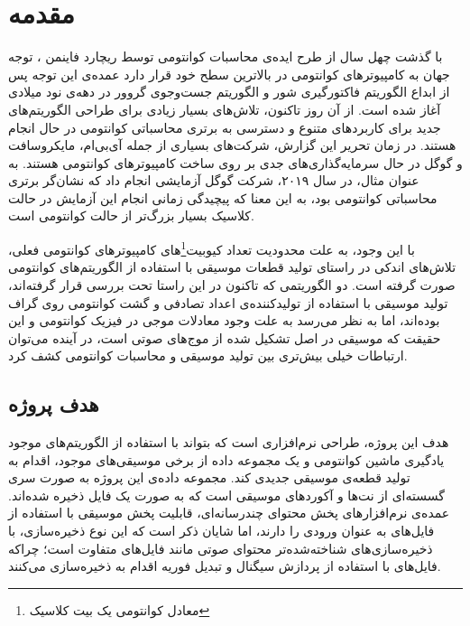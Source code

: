 \chapter{مقدمه}


با گذشت چهل سال از طرح ایده‌ی محاسبات کوانتومی توسط ریچارد فاینمن
\cite{feynman}،
توجه جهان به کامپیوترهای کوانتومی در بالاترین سطح خود قرار دارد
عمده‌ی این توجه پس از ابداع الگوریتم فاکتورگیری شور
و الگوریتم جست‌وجوی گروور 
در دهه‌ی نود میلادی آغاز شده است. از آن روز تاکنون، تلاش‌های بسیار زیادی برای طراحی الگوریتم‌های جدید برای کاربردهای متنوع و دسترسی به برتری محاسباتی کوانتومی در حال انجام هستند. در زمان تحریر این گزارش، شرکت‌های بسیاری از جمله آی‌بی‌ام، مایکروسافت و گوگل در حال سرمایه‌گذاری‌های جدی بر روی ساخت کامپیوترهای کوانتومی هستند. به عنوان مثال، در سال ۲۰۱۹،
شرکت گوگل آزمایشی 
\cite{google_supremacy}
انجام داد که نشان‌گر برتری محاسباتی کوانتومی بود، به این معنا که پیچیدگی زمانی انجام این آزمایش در حالت کلاسیک بسیار بزرگ‌تر از حالت کوانتومی است.

با این وجود، به علت محدودیت تعداد کیوبیت\footnote{معادل کوانتومی یک بیت کلاسیک}های کامپیوترهای کوانتومی فعلی، تلاش‌های اندکی در راستای تولید قطعات موسیقی با استفاده از الگوریتم‌های کوانتومی صورت گرفته است. دو الگوریتمی که تاکنون در این راستا تحت بررسی قرار گرفته‌اند، تولید موسیقی با استفاده از تولیدکننده‌ی اعداد تصادفی
و گشت کوانتومی روی گراف
\cite{miranda}
بوده‌اند، اما به نظر می‌رسد به علت وجود معادلات موجی در فیزیک کوانتومی و این حقیقت که موسیقی در اصل تشکیل شده از موج‌های صوتی است، در آینده می‌توان ارتباطات خیلی بیش‌تری بین تولید موسیقی و محاسبات کوانتومی کشف کرد.

\section{هدف پروژه}
هدف این پروژه، طراحی نرم‌افزاری است که بتواند با استفاده از الگوریتم‌های موجود یادگیری ماشین کوانتومی و یک  مجموعه داده از برخی موسیقی‌های موجود، اقدام به تولید قطعه‌ی موسیقی
جدیدی کند.
مجموعه داده‌ی این پروژه به صورت سری گسسته‌ای از نت‌ها و آکوردهای موسیقی است که به صورت یک فایل 
ذخیره شده‌اند.
عمده‌ی نرم‌افزارهای پخش محتوای چندرسانه‌ای، قابلیت پخش موسیقی با استفاده از فایل‌های 
به عنوان ورودی را دارند، اما
 شایان ذکر است که این نوع ذخیره‌سازی، با ذخیره‌سازی‌های شناخته‌شده‌تر محتوای صوتی مانند فایل‌های 
 متفاوت است؛ چراکه فایل‌های
 با استفاده از پردازش سیگنال و تبدیل فوریه اقدام به ذخیره‌سازی می‌کنند.
 
